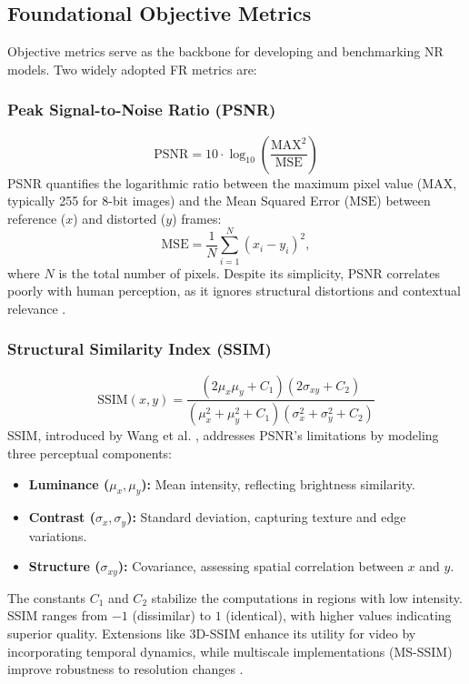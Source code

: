 \subsection{Foundational Objective Metrics}  
\label{subsec:metrics}  
Objective metrics serve as the backbone for developing and benchmarking NR models. Two widely adopted FR metrics are:  

\subsubsection{Peak Signal-to-Noise Ratio (PSNR)}  
\begin{equation}  
\text{PSNR} = 10 \cdot \log_{10}\left(\frac{\text{MAX}^2}{\text{MSE}}\right)  
\label{eq:psnr}  
\end{equation}  
PSNR quantifies the logarithmic ratio between the maximum pixel value ($\text{MAX}$, typically 255 for 8-bit images) and the Mean Squared Error ($\text{MSE}$) between reference ($x$) and distorted ($y$) frames:  
\[  
\text{MSE} = \frac{1}{N} \sum_{i=1}^{N} (x_i - y_i)^2,  
\]  
where $N$ is the total number of pixels. Despite its simplicity, PSNR correlates poorly with human perception, as it ignores structural distortions and contextual relevance \cite{huynh2012scope}.  

\subsubsection{Structural Similarity Index (SSIM)}  
\begin{equation}  
\text{SSIM}(x, y) = \frac{(2 \mu_x \mu_y + C_1)(2 \sigma_{xy} + C_2)}{(\mu_x^2 + \mu_y^2 + C_1)(\sigma_x^2 + \sigma_y^2 + C_2)}  
\label{eq:ssim}  
\end{equation}  
SSIM, introduced by Wang et al. \cite{wang2004ssim}, addresses PSNR's limitations by modeling three perceptual components:  
\begin{itemize}  
    \item \textbf{Luminance ($\mu_x, \mu_y$):} Mean intensity, reflecting brightness similarity.  
    \item \textbf{Contrast ($\sigma_x, \sigma_y$):} Standard deviation, capturing texture and edge variations.  
    \item \textbf{Structure ($\sigma_{xy}$):} Covariance, assessing spatial correlation between $x$ and $y$.  
\end{itemize}  
The constants $C_1$ and $C_2$ stabilize the computations in regions with low intensity. SSIM ranges from $-1$ (dissimilar) to $1$ (identical), with higher values indicating superior quality. Extensions like 3D-SSIM \cite{zeng2012_3dssim} enhance its utility for video by incorporating temporal dynamics, while multiscale implementations (MS-SSIM) improve robustness to resolution changes \cite{wang2003multiscale}.  

